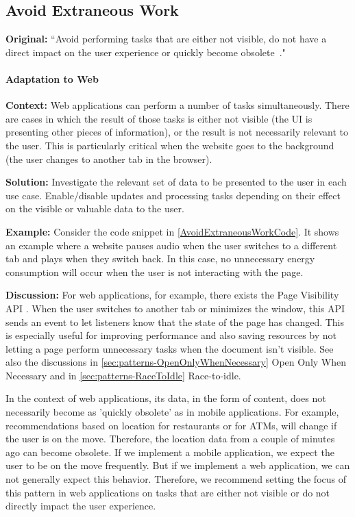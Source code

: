 \subsection{Avoid Extraneous Work}\label{sec:patterns-AvoidExtraneousWork}
\textbf{Original:} ``Avoid performing tasks that are either not visible, do not have a direct impact on the user experience or quickly become obsolete~\cite{cruz2019catalog}."

\paragraph{Adaptation to Web}\mbox{}

\textbf{Context:} Web applications can perform a number of tasks simultaneously. There are cases in which the result of those tasks is either not visible (\eg the UI is presenting other pieces of information), or the result is not necessarily relevant to the user. This is particularly critical when the website goes to the background (\eg the user changes to another tab in the browser).

\textbf{Solution:} Investigate the relevant set of data to be presented to the user in each use case. Enable/disable updates and processing tasks depending on their effect on the visible or valuable data to the user.

\textbf{Example:} Consider the code snippet in \autoref{AvoidExtraneousWorkCode}. It shows an example where a website pauses audio when the user switches to a different tab and plays when they switch back. In this case, no unnecessary energy consumption will occur when the user is not interacting with the page.

\textbf{Discussion:} For web applications, for example, there exists the Page Visibility API \cite{dev-mozilla-page-visibility-api}. When the user switches to another tab or minimizes the window, this API sends an event to let listeners know that the state of the page has changed. This is especially useful for improving performance and also saving resources by not letting a page perform unnecessary tasks when the document isn't visible. See also the discussions in \ref{sec:patterns-OpenOnlyWhenNecessary} Open Only When Necessary and in \ref{sec:patterns-RaceToIdle} Race-to-idle.

In the context of web applications, its data, in the form of content, does not necessarily become as 'quickly obsolete' as in mobile applications. For example, recommendations based on location \eg for restaurants or for ATMs, will change if the user is on the move. Therefore, the location data from a couple of minutes ago can become obsolete. If we implement a mobile application, we expect the user to be on the move frequently. But if we implement a web application, we can not generally expect this behavior. Therefore, we recommend setting the focus of this pattern in web applications on tasks that are either not visible or do not directly impact the user experience.

